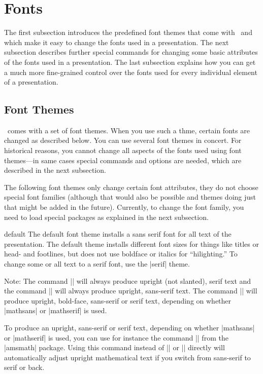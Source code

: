 
%


\section{Fonts}

The first subsection introduces the predefined font
themes that come with \beamer\ and which make it easy to change the
fonts used in a presentation. The next subsection describes further
special commands for changing some basic attributes of the fonts used in a 
presentation. The last subsection explains how you can get a much more
fine-grained control over the fonts used for every individual element
of a presentation. 





\subsection{Font Themes}

\beamer\ comes with a set of font themes. When you use such a thme,
certain fonts are changed as described below. You can use several font
themes in concert. For historical reasons, you cannot change all
aspects of the fonts used using font themes---in same cases special
commands and options are needed, which are described in the next
subsection.

The following font themes only change certain font attributes, they do
not choose special font families (although that would also be possible
and themes doing just that might be added in the future). Currently,
to change the font family, you need to load special packages as
explained in the next subsection.


\begin{fontthemeexample}{default}
  The default font theme installs a sans serif font for all text of
  the presentation. The default theme installs different font sizes
  for things like titles or head- and footlines, but does not use
  boldface or italics for ``hilighting.'' To change some or all text
  to a serif font, use the |serif| theme.

  Note: The command |\mathrm| will always produce upright (not
  slanted), serif text and the command |\mathsf| will always produce
  upright, sans-serif text. The command |\mathbf| will produce
  upright, bold-face, sans-serif or serif text, depending on whether
  |mathsans| or |mathserif| is used.

  To produce an upright, sans-serif or serif text, depending on
  whether |mathsans| or |mathserif| is used, you can use for instance
  the command |\operatorname| from the |amsmath| package. Using this
  command instead of |\mathrm| or |\mathsf| directly will
  automatically adjust  upright mathematical text if you switch from
  sans-serif to serif or back.
\end{fontthemeexample}


